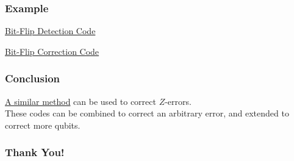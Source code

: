 \documentclass[notheorems]{beamer}
\begin{document}
\begin{frame}
\frametitle{Example}
        \href{https://algassert.com/quirk\#circuit=\%7B\%22cols\%22\%3A\%5B\%5B\%22\%E2\%80\%A2\%22\%2C\%22X\%22\%5D\%2C\%5B\%22\%E2\%80\%A6\%22\%2C\%22\%E2\%80\%A6\%22\%2C\%22\%E2\%80\%A6\%22\%5D\%2C\%5B\%22X\%22\%5D\%2C\%5B\%22\%E2\%80\%A6\%22\%2C\%22\%E2\%80\%A6\%22\%2C\%22\%E2\%80\%A6\%22\%5D\%2C\%5B1\%2C1\%2C\%22H\%22\%5D\%2C\%5B\%22Z\%22\%2C\%22Z\%22\%2C\%22\%E2\%80\%A2\%22\%5D\%2C\%5B1\%2C1\%2C\%22H\%22\%5D\%5D\%7D}{Bit-Flip Detection Code}\pause

        \href{https://algassert.com/quirk\#circuit=\%7B\%22cols\%22\%3A\%5B\%5B\%22\%E2\%80\%A2\%22\%2C\%22X\%22\%5D\%2C\%5B\%22\%E2\%80\%A2\%22\%2C1\%2C\%22X\%22\%5D\%2C\%5B\%22\%E2\%80\%A6\%22\%2C\%22\%E2\%80\%A6\%22\%2C\%22\%E2\%80\%A6\%22\%5D\%2C\%5B\%22X\%22\%5D\%2C\%5B\%22\%E2\%80\%A6\%22\%2C\%22\%E2\%80\%A6\%22\%2C\%22\%E2\%80\%A6\%22\%5D\%2C\%5B\%22\%E2\%80\%A2\%22\%2C\%22X\%22\%5D\%2C\%5B\%22\%E2\%80\%A2\%22\%2C1\%2C\%22X\%22\%5D\%2C\%5B\%22X\%22\%2C\%22\%E2\%80\%A2\%22\%2C\%22\%E2\%80\%A2\%22\%5D\%5D\%7D}{Bit-Flip Correction Code}
\end{frame}

\begin{frame}
\frametitle{Conclusion}
\href{https://algassert.com/quirk\#circuit=\%7B\%22cols\%22\%3A\%5B\%5B\%22\%E2\%80\%A2\%22\%2C\%22X\%22\%5D\%2C\%5B\%22\%E2\%80\%A2\%22\%2C1\%2C\%22X\%22\%5D\%2C\%5B\%22H\%22\%2C\%22H\%22\%2C\%22H\%22\%5D\%2C\%5B\%22\%E2\%80\%A6\%22\%2C\%22\%E2\%80\%A6\%22\%2C\%22\%E2\%80\%A6\%22\%5D\%2C\%5B\%22Z\%22\%5D\%2C\%5B\%22\%E2\%80\%A6\%22\%2C\%22\%E2\%80\%A6\%22\%2C\%22\%E2\%80\%A6\%22\%5D\%2C\%5B\%22H\%22\%2C\%22H\%22\%2C\%22H\%22\%5D\%2C\%5B\%22\%E2\%80\%A2\%22\%2C\%22X\%22\%5D\%2C\%5B\%22\%E2\%80\%A2\%22\%2C1\%2C\%22X\%22\%5D\%2C\%5B\%22X\%22\%2C\%22\%E2\%80\%A2\%22\%2C\%22\%E2\%80\%A2\%22\%5D\%5D\%7D}{A similar method} can be used to correct $Z$-errors.\\\pause
These codes can be combined to correct an arbitrary error, and extended to correct more qubits.
\end{frame}

\begin{frame}[allowframebreaks]
\frametitle{Thank You!}

\nocite{*}
\printbibliography

\end{frame}
\end{document}
